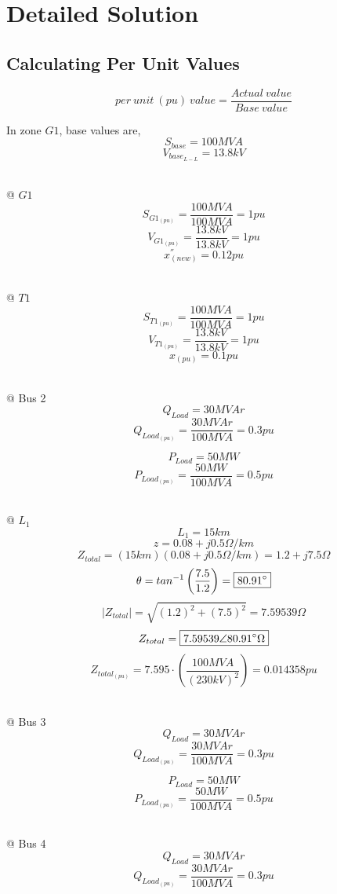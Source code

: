 \documentclass[12pt]{article}
\begin{document}
        \section{Detailed Solution}
        \subsection{Calculating Per Unit Values}
        $$per\ unit\ (pu)\ value=\frac{Actual\ value}{Base\ value}$$
        
        
        In zone $G1$, base values are,
        $$S_{base}=100MVA$$
        $$V_{base_{L-L}}=13.8kV$$
        
        \ \\
        @ $G1$
        $$S_{G1_{(pu)}}=\frac{100MVA}{100MVA}=\boxed{1pu}$$
        $$V_{G1_{(pu)}}=\frac{13.8kV}{13.8kV}=\boxed{1pu}$$
        $$x^{''}_{(new)}=\boxed{0.12pu}$$

        \ \\
        @ $T1$
        $$S_{T1_{(pu)}}=\frac{100MVA}{100MVA}=\boxed{1pu}$$
        $$V_{T1_{(pu)}}=\frac{13.8kV}{13.8kV}=\boxed{1pu}$$
        $$x_{(pu)}=\boxed{0.1pu}$$

        \ \\
        @ Bus 2
        $$Q_{Load}=30MVAr$$
        $$Q_{Load_{(pu)}}=\frac{30MVAr}{100MVA}=\boxed{0.3pu}$$
        
        $$P_{Load}=50MW$$
        $$P_{Load_{(pu)}}=\frac{50MW}{100MVA}=\boxed{0.5pu}$$

        \ \\
        @ $L_1$
        $$L_1=15km$$
        $$z=0.08+j0.5\Omega/km$$
        $$Z_{total}=(15km)(0.08+j0.5\Omega/km)=\boxed{1.2+j7.5\Omega}$$
        $$\theta=tan^{-1}\left(\frac{7.5}{1.2}\right)=\boxed{80.91\degree}$$
        $$|Z_{total}|=\sqrt{(1.2)^2+(7.5)^2}=\boxed{7.59539\Omega}$$
        $$Z_{total}=\boxed{7.59539\angle80.91\degree\Omega}$$
        $$Z_{total_{(pu)}}=7.595\cdot\left(\frac{100MVA}{(230kV)^2}\right)=\boxed{0.014358pu}$$

        \ \\
        @ Bus 3
        $$Q_{Load}=30MVAr$$
        $$Q_{Load_{(pu)}}=\frac{30MVAr}{100MVA}=\boxed{0.3pu}$$
        
        $$P_{Load}=50MW$$
        $$P_{Load_{(pu)}}=\frac{50MW}{100MVA}=\boxed{0.5pu}$$
        
        \ \\
        @ Bus 4
        $$Q_{Load}=30MVAr$$
        $$Q_{Load_{(pu)}}=\frac{30MVAr}{100MVA}=\boxed{0.3pu}$$
        
\end{document}
